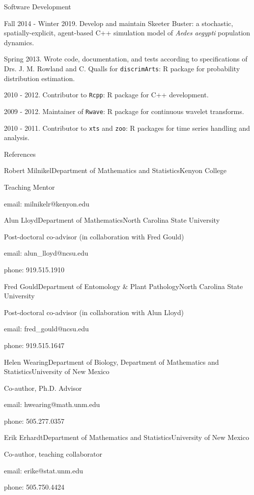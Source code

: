 \documentclass{resume} %
\begin{document}
\clearpage
\begin{rSection}{Software Development}
\item Fall 2014 - Winter 2019. Develop and maintain Skeeter Buster: a stochastic,
spatially-explicit, agent-based C++ simulation model of {\em Aedes aegypti}
population dynamics.
\item Spring 2013. Wrote code, documentation, and tests according to
specifications of Drs. J. M. Rowland and C. Qualls for \texttt{discrimArts}: R package for probability
distribution estimation.
\item 2010 - 2012. Contributor to \texttt{Rcpp}: R package for C++ development.
\item 2009 - 2012. Maintainer of \texttt{Rwave}: R package for continuous wavelet transforms.
\item 2010 - 2011. Contributor to \texttt{xts} and \texttt{zoo}: R packages for time series handling and analysis.
\end{rSection}

\begin{rSection}{References}
\begin{rSubsection}{Robert Milnikel}{}{Department of Mathematics and Statistics}{Kenyon College}
\item Teaching Mentor
\item email: milnikelr@kenyon.edu
\end{rSubsection}
\begin{rSubsection}{Alun Lloyd}{}{Department of Mathematics}{North Carolina State University}
\item Post-doctoral co-advisor (in collaboration with Fred Gould)
\item email: alun\_lloyd@ncsu.edu
\item phone:  919.515.1910
\end{rSubsection}
\begin{rSubsection}{Fred Gould}{}{Department of Entomology \& Plant Pathology}{North Carolina State University}
\item Post-doctoral co-advisor (in collaboration with Alun Lloyd)
\item email: fred\_gould@ncsu.edu
\item phone: 919.515.1647 
\end{rSubsection}
\begin{rSubsection}{Helen Wearing}{}{Department of Biology, Department of Mathematics and Statistics}{University of New Mexico}
\item Co-author, Ph.D. Advisor
\item email: hwearing@math.unm.edu
\item phone: 505.277.0357
\end{rSubsection}
\begin{rSubsection}{Erik Erhardt}{}{Department of Mathematics and Statistics}{University of New Mexico}
\item Co-author, teaching collaborator
\item email: erike@stat.unm.edu
\item phone: 505.750.4424
\end{rSubsection}
\end{rSection}
\end{document}
